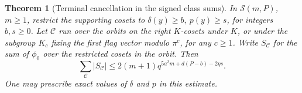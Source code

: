 \documentclass[a4paper,11pt]{article}
\newtheorem{theorem}[proposition]{Theorem}
\theoremstyle{definition}
\theoremstyle{remark}
\numberwithin{equation}{section}
\begin{document}
\begin{theorem}[Terminal cancellation in the signed class sums]
\leavevmode\label{thm:inertterminal903}
In \(\mathcal S(m,P)\), \(m\ge1\), restrict the supporting
cosets to \(\delta(y)\ge b,\ p(y)\ge s\), for integers \(b,s\ge0\).
Let \(\mathcal C\) run over the orbits on the right \(K\)-cosets
under \(K\), or under the subgroup \(K_c\) fixing the first flag
vector modulo \(\pi^c\), for any \(c\ge1\).
Write \(S_{\mathcal C}\) for the sum of \(\phi_0\) over the
restricted cosets in the orbit. Then
\begin{equation}
      \sum_{\mathcal C}|S_{\mathcal C}|
           \le 2(m+1)q^{5a^2m+d(P-b)-2\eta s}.
 \label{eq:inertterminal903}
\end{equation}
One may prescribe exact values of \(\delta\) and \(p\) in this
estimate.
\end{theorem}
\end{document}
